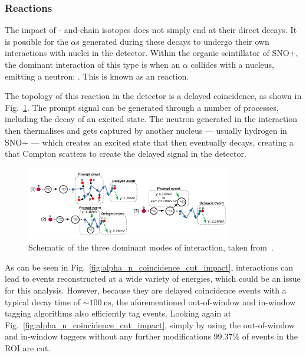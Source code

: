 \subsubsection{\alphan{} Reactions}\label{sec:alphans}
The impact of - and-chain isotopes does not simply end at their direct decays. It is possible for the $\alpha$s generated during these decays to undergo their own interactions with nuclei in the detector. Within the organic scintillator of SNO+, the dominant interaction of this type is when an $\alpha$ collides with a  nucleus, emitting a neutron: . This is known as an \alphan{} reaction.

The topology of this reaction in the detector is a delayed coincidence, as shown in Fig.~\ref{fig:alpha_n_drawing}. %
The prompt signal can be generated through a number of processes, including the decay of an excited  state. The neutron generated in the interaction then thermalises and gets captured by another nucleus --- usually hydrogen in SNO+ --- which creates an excited state that then eventually decays, creating a \ce{\gamma} that Compton scatters to create the delayed signal in the detector.

\begin{figure}
    \centering
    \includegraphics[width=0.8\textwidth]{6_SolarAnalysis/images/alpha_n_schematic_Iwan_modified.pdf}
    \caption[Schematic of \alphan{} interactions]
    {Schematic of the three dominant modes of \alphan{} interaction, taken from~\cite{morton-blakeFirstMeasurementReactor2021}. %
    }
    \label{fig:alpha_n_drawing}
\end{figure}

As can be seen in Fig.~\ref{fig:alpha_n_coincidence_cut_impact}, \alphan{} interactions can lead to events reconstructed at a wide variety of energies, which could be an issue for this analysis. However, because they are delayed coincidence events with a typical decay time of $\sim\SI{100}{\nano\second}$, the aforementioned out-of-window and in-window  tagging algorithms also efficiently tag \alphan{} events. Looking again at Fig.~\ref{fig:alpha_n_coincidence_cut_impact}, simply by using the out-of-window and in-window  taggers without any further modifications 99.37\% of events in the ROI are cut.

